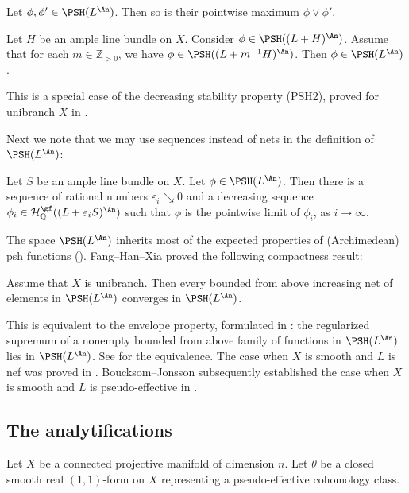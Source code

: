 \begin{proposition}[{\cite[Theorem~4.7]{BJ22}}]\label{prop:BJclosedmax}
    Let $\phi,\phi'\in \PSH(L^{\An})$. Then so is their pointwise maximum $\phi\lor \phi'$.
\end{proposition}

\begin{proposition}\label{prop:BJdecseqstab}
    Let $H$ be an ample line bundle on $X$. Consider $\phi\in \PSH((L+H)^{\An})$.
    Assume that for each $m\in \mathbb{Z}_{>0}$, we have $\phi\in \PSH((L+m^{-1}H)^{\An})$. Then $\phi\in \PSH(L^{\An})$.
\end{proposition}
This is a special case of the decreasing stability property (PSH2), proved for unibranch $X$ in \cite[Corollary~8.4]{FHX26}.

Next we note that we may use sequences instead of nets in the definition of $\PSH(L^{\An})$:
\begin{theorem}[{\cite[Corollary~12.18]{BJ22}}]\label{thm:BJappseq}
Let $S$ be an ample line bundle on $X$. Let $\phi \in \PSH(L^{\An})$.
Then there is a sequence of rational numbers $\varepsilon_i\searrow 0$ and a decreasing sequence $\phi_i\in \mathcal{H}^{\gf}_{\mathbb{Q}}((L+\varepsilon_i S)^{\An})$ such that $\phi$ is the pointwise limit of $\phi_i$, as $i\to\infty$.
\end{theorem}


The space $\PSH(L^{\An})$ inherits most of the expected properties of (Archimedean) psh functions (\cite[Theorem~4.7]{BJ22}). Fang--Han--Xia proved the following compactness result:
\begin{theorem}\label{thm:NApshincreasing}
Assume that $X$ is unibranch. Then every bounded from above increasing net of elements in $\PSH(L^{\An})$ converges in $\PSH(L^{\An})$.
\end{theorem}
This is equivalent to the envelope property, formulated in \cite[Conjecture~5.14]{BJ22}: the regularized supremum of a nonempty bounded from above family of functions in $\PSH(L^{\An})$ lies in $\PSH(L^{\An})$. See \cite[Theorem~5.11]{BJ22} for the equivalence. The case when $X$ is smooth and $L$ is nef was proved in \cite{BJ22}. Boucksom--Jonsson subsequently established the case when $X$ is smooth and $L$ is pseudo-effective in \cite{BJ22b}.


\subsection{The analytifications}
\label{subsec:analytifications}
Let $X$ be a connected projective manifold of dimension $n$. Let $\theta$ be a closed smooth real $(1,1)$-form on $X$ representing a pseudo-effective cohomology class.

